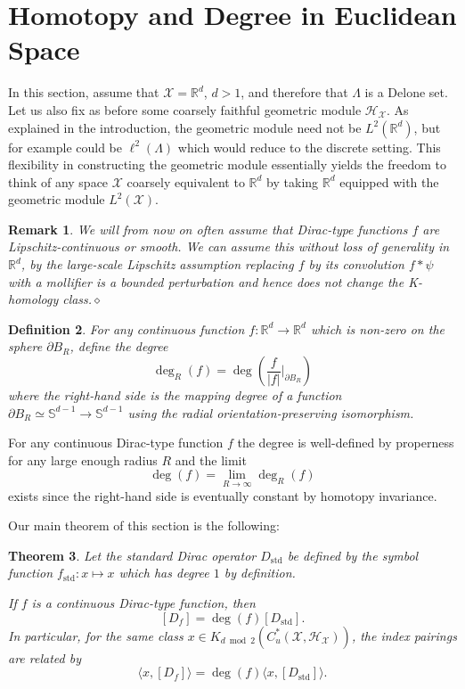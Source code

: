 \documentclass[12pt]{amsart}
\newtheorem{theorem}{Theorem}[section]
\newtheorem{definition}[theorem]{Definition}
\newtheorem{remark}[theorem]{Remark}
\newcommand{\RM}{{\mathbb R}}
\newcommand{\SM}{{\mathbb S}}
\newcommand{\Hh}{{\mathcal H}}
\newcommand{\Xx}{{\mathcal X}}
\newcommand{\pdv}{\partial}
\providecommand{\abs}[1]{\left \lvert#1 \right \rvert}
\begin{document}
\section{Homotopy and Degree in Euclidean Space}\label{sec:euc_space}
\label{sec:degree}

In this section, assume that $\Xx = \RM^d$, $d > 1$, and therefore that $\Lambda$ is a Delone set. Let us also fix as before some coarsely faithful geometric module $\Hh_\Xx$. As explained in the introduction, the geometric module need not be $L^2(\RM^d)$, but for example could be $\ell^2(\Lambda)$ which would reduce to the discrete setting. 
This flexibility in constructing the geometric module essentially yields the freedom to think of any space $\Xx$ coarsely equivalent to $\RM^d$ by taking $\RM^d$ equipped with the geometric module $L^2(\Xx)$.

\begin{remark}
\label{rem:flipschitz}
{\rm We will from now on often assume that Dirac-type functions $f$ are Lipschitz-continuous or smooth. We can assume this without loss of generality in $\RM^d$, by the large-scale Lipschitz assumption replacing $f$ by its convolution $f*\psi$ with a mollifier is a bounded perturbation and hence does not change the K-homology class.}$\diamond$
\end{remark}

\begin{definition}
For any continuous function $f: \RM^d \to \RM^d$ which is non-zero on the sphere $\pdv B_R$, define the degree
$$\deg_R(f) = \deg\left(\frac{f}{\abs{f}}\bigg\rvert_{\pdv B_R}\right)$$
where the right-hand side is the mapping degree of a function $\pdv B_R\simeq \SM^{d-1}\to \SM^{d-1}$ using the radial orientation-preserving isomorphism.
\end{definition}
For any continuous Dirac-type function $f$ the degree is well-defined by properness for any large enough radius $R$ and the limit
$$\deg(f) = \lim_{R\to \infty}\deg_R(f)$$
exists since the right-hand side is eventually constant by homotopy invariance.

Our main theorem of this section is the following:

\begin{theorem}\label{thm:degree_multiplicity}
Let the standard Dirac operator $D_{\mathrm{std}}$ be defined by the symbol function $f_{\mathrm{std}}: x\mapsto x$ which has degree $1$ by definition.

If $f$ is a continuous Dirac-type function, then 
$$[D_f] = \deg(f)[D_{\mathrm{std}}].$$
In particular, for the same class $x\in K_{d \bmod 2}(C^*_u(\Xx, \Hh_\Xx))$, the index pairings are related by
$$\langle x, [D_f] \rangle =\deg(f) \langle x, [D_{\mathrm{std}}]\rangle.$$
\end{theorem}
\end{document}
